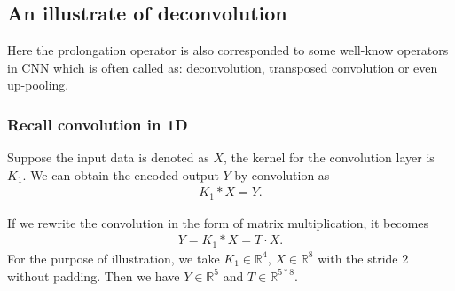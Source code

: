 \subsection{An illustrate of deconvolution}

Here the prolongation operator is also corresponded to some
well-know operators in CNN which is often called as: deconvolution, transposed convolution or even up-pooling.


\subsubsection{Recall convolution in 1D}
Suppose the input data is denoted as $X$, the kernel for the convolution layer is $K_1$. We can obtain the encoded output $Y$ by convolution as
\begin{align}
    K_1 \ast X  = Y.
\end{align}

If we rewrite the convolution in the form of matrix multiplication, it becomes
\begin{align}
   Y = K_1 \ast X = T \cdot X.
\end{align}
For the purpose of illustration, we take $K_1 \in \mathbb{R}^4$, $X \in \mathbb{R}^8$ with the stride  2 without padding. Then we have $Y \in \mathbb{R}^5$ and $T \in \mathbb{R}^{5*8}$.

